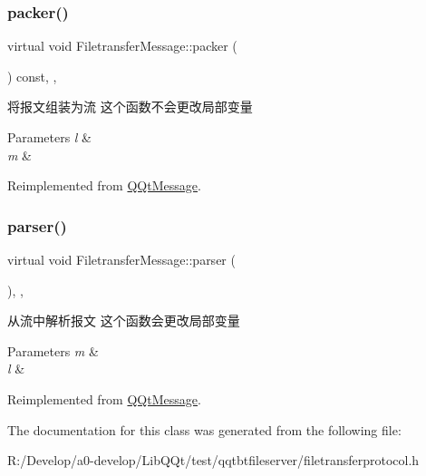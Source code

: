 \subsubsection{\texorpdfstring{packer()}{packer()}}
{\footnotesize\ttfamily virtual void Filetransfer\+Message\+::packer (\begin{DoxyParamCaption}\item[{Q\+Byte\+Array \&}]{ }\end{DoxyParamCaption}) const\hspace{0.3cm}{\ttfamily [inline]}, {\ttfamily [override]}, {\ttfamily [virtual]}}



将报文组装为流 这个函数不会更改局部变量 


\begin{DoxyParams}{Parameters}
{\em l} & \\
\hline
{\em m} & \\
\hline
\end{DoxyParams}


Reimplemented from \mbox{\hyperlink{class_q_qt_message_af1885c2c3628495808dca66ee8d72e14}{Q\+Qt\+Message}}.

\mbox{\label{class_filetransfer_message_a3f25d77aadf5f260ef3696d9bec4b34e}} 
\subsubsection{\texorpdfstring{parser()}{parser()}}
{\footnotesize\ttfamily virtual void Filetransfer\+Message\+::parser (\begin{DoxyParamCaption}\item[{const Q\+Byte\+Array \&}]{ }\end{DoxyParamCaption})\hspace{0.3cm}{\ttfamily [inline]}, {\ttfamily [override]}, {\ttfamily [virtual]}}



从流中解析报文 这个函数会更改局部变量 


\begin{DoxyParams}{Parameters}
{\em m} & \\
\hline
{\em l} & \\
\hline
\end{DoxyParams}


Reimplemented from \mbox{\hyperlink{class_q_qt_message_a0bc25669bdd61490b1d8df6d77565f31}{Q\+Qt\+Message}}.



The documentation for this class was generated from the following file\+:\begin{DoxyCompactItemize}
\item 
R\+:/\+Develop/a0-\/develop/\+Lib\+Q\+Qt/test/qqtbtfileserver/filetransferprotocol.\+h\end{DoxyCompactItemize}
